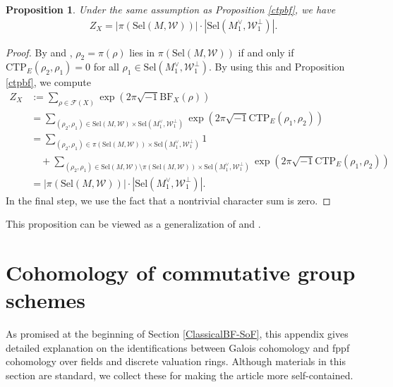 \documentclass[a4paper]{amsart}
\newtheorem{prop}[thm]{Proposition}
\theoremstyle{definition}
\numberwithin{equation}{section}
\begin{document}
\begin{prop}\label{onshell}
Under the same assumption as Proposition \ref{ctpbf}, we have
    \begin{align*}
    Z_X = | \pi (\mathrm{Sel}(M,\mathscr{W}))| \cdot |\mathrm{Sel} (M_1^\vee, \mathscr{W}_1^\perp) |.
    \end{align*}
\end{prop}

\begin{proof}
By \cite[Theorem 2.1]{MS24} and \cite[Proposition 3.4]{MS21}, $\rho_2=\pi(\rho)$ lies in $\pi (\mathrm{Sel}(M,\mathscr{W}))$ if and only if $\mathrm{CTP}_E(\rho_2, \rho_1)=0$ for all $\rho_1 \in \mathrm{Sel} (M_1^\vee, \mathscr{W}_1^\perp)$. By using this and Proposition \ref{ctpbf}, we compute
\begin{align*}
    Z_X&:=\sum_{\rho\in\mathscr{F}(X)}\exp\left(2\pi\sqrt{-1}\mathrm{BF}_X(\rho)\right)\\
        &=\sum_{(\rho_2,\rho_1) \in \mathrm{Sel}(M,\mathscr{W})\times \mathrm{Sel} (M_1^\vee, \mathscr{W}_1^\perp)}\exp\left(2\pi\sqrt{-1}\mathrm{CTP}_E(\rho_1,\rho_2)\right)\\
        &= \sum_{(\rho_2,\rho_1) \in \pi (\mathrm{Sel}(M,\mathscr{W}))\times \mathrm{Sel} (M_1^\vee, \mathscr{W}_1^\perp) }1 \\
        &\quad+\sum_{(\rho_2,\rho_1) \in \mathrm{Sel}(M,\mathscr{W})\setminus \pi (\mathrm{Sel}(M,\mathscr{W}))\times \mathrm{Sel} (M_1^\vee, \mathscr{W}_1^\perp)}\exp\left(2\pi\sqrt{-1}\mathrm{CTP}_E(\rho_1,\rho_2)\right)\\
        &= | \pi (\mathrm{Sel}(M,\mathscr{W}))| \cdot |\mathrm{Sel} (M_1^\vee, \mathscr{W}_1^\perp)|.
\end{align*}
    In the final step, we use the fact that a nontrivial character sum is zero.
\end{proof}

This proposition can be viewed as a generalization of \cite[Proposition 1.2]{CaKi22} and \cite[Proposition 2.3]{PP25}.





\appendix
\section{Cohomology of commutative group schemes}\label{fppf-comparison}

As promised at the beginning of Section \ref{ClassicalBF-SoF}, this appendix gives detailed explanation on the identifications between Galois cohomology and fppf cohomology over fields and discrete valuation rings. Although materials in this section are standard, we collect these for making the article more self-contained.
\end{document}
